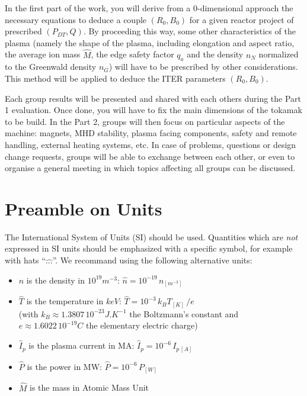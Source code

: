 In the first part of the work, you will derive from a 0-dimensional approach the necessary equations to deduce a couple $(R_0, B_0)$ for a given reactor project of prescribed $(P_{DT}, Q)$. By proceeding this way, some other characteristics of the plasma (namely the shape of the plasma, including elongation and aspect ratio, the average ion mass $\hat M$, the edge safety factor $q_a$ and the density $n_N$ normalized to the Greenwald density $n_G$) will have to be prescribed by other considerations. This method will be applied to deduce the ITER parameters $(R_0, B_0)$. 

Each group results will be presented and shared with each others during the Part 1 evaluation. Once done, you will have to fix the main dimensions of the tokamak to be build. In the Part 2, groups will then focus on particular aspects of the machine: magnets, MHD stability, plasma facing components, safety and remote handling, external heating systems, etc. In case of problems, questions or design change requests, groups will be able to exchange between each other, or even to organise a general meeting in which topics affecting all groups can be discussed.

\section{Preamble on Units}
The International System of Units (SI) should be used. Quantities which are \emph{not} expressed in SI units should be emphasized with a specific symbol, for example with hats ``$\hat{...}$''. We recommand using the following alternative units:

\begin{itemize}
	\item $\hat n$ is the density in $10^{19} \si{m^{-3}}$: 
	$\hat n = 10^{-19}\,n_{\si{[m^{-3}]}}$
	\item $\hat T$ is the temperature in $keV$: $\hat T = 10^{-3}\, k_B T_{[K]}\,/e$ \\(with $k_B \approx 1.3807\, 10^{-23} \si{J.K^{-1}}$ the Boltzmann's constant and $e\approx 1.6022\, 10^{-19}C$ the elementary electric charge)
	\item $\hat I_p$ is the plasma current in MA: $\hat I_p = 10^{-6}\,I_{p\,[A]}$
	\item $\hat P$ is the power in MW: $\hat P = 10^{-6}\, P_{[W]}$
	\item $\hat M$ is the mass in Atomic Mass Unit
\end{itemize}

